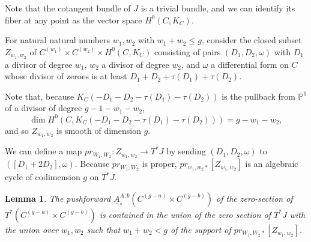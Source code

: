 \documentclass[12pt]{amsart}
\newtheorem{lemma}[theorem]{Lemma}
\theoremstyle{definition}
\theoremstyle{remark}
\begin{document}
Note that the cotangent bundle of $J$ is a trivial bundle, and we can identify its fiber at any point as the vector space $H^0(C, K_C)$.  
  
 For natural natural numbers $w_1,w_2$ with $w_1+ w_2 \leq g$, consider the closed subset $Z_{w_1,w_2}$ of  $C^{ (w_1) } \times C^{ (w_2)} \times H^0(C, K_C) $ consisting of pairs $(D_1,D_2, \omega )$ with $D_1$ a divisor of degree $w_1$, $w_2$ a divisor of degree $w_2$, and $\omega$ a differential form on $C$ whose divisor of zeroes is at least $D_1+D_2+ \tau(D_1) + \tau(D_2)$. 
 
 Note that, because $K_C (- D_1- D_2-  \tau(D_1) - \tau(D_2) )$ is the pullback from $\mathbb P^1$ of a divisor of degree $g-1 -w_1-w_2$, \[\dim H^0 (C, K_C (- D_1- D_2-  \tau(D_1) - \tau(D_2) ) ) = g-w_1-w_2,\] and so $Z_{w_1,w_2}$ is smooth of dimension $g$.
  
 We can define a map $pr_{W_1,W_2}: Z_{w_1,w_2} \to T^* J$ by sending $(D_1,D_2, \omega)$ to $( [D_1+ 2D_2], \omega)$. Because $pr_{W_1, W_2}$ is proper, $pr_{w_1,w_2 *} [ Z_{w_1,w_2} ] $ is an algebraic cycle of codimension $g$ on $T^* J$. 

\begin{lemma}\label{ts-singular} The pushforward $ \underline{A}^{A,b}_{\circ} (C^{(g-a)} \times C^{(g-b)} ) $ of the zero-section of $T^* ( C^{(g-a)} \times C^{(g-b)} )$ is contained in the union of the zero section of $T^* J$ with the union over $w_1,w_2$ such that $w_1+w_2<g$ of the support of $pr_{W_1,W_2 *} [ Z_{w_1,w_2} ]$. \end{lemma}
\end{document}

